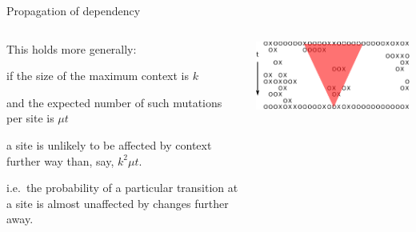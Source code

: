 \documentclass[smaller]{beamer}
\begin{document}
\begin{frame}{Propagation of dependency}

  \begin{columns}[c]
    \begin{column}{.5\textwidth}

      This holds more generally:

      \vspace{1em}

      if the size of the maximum context is $k$

      \vspace{1em}

      and the expected number of such mutations per site is $\mu t$

      \vspace{1em}

      a site is unlikely to be affected by context further way than, say, $k^2 \mu t$.

      \vspace{1em}

      i.e.\ the probability of a particular transition at a site is almost unaffected by changes further away.

    \end{column}
    \begin{column}{.5\textwidth}

      \includegraphics[width=\textwidth]{../../../writeup-plots/talk-tasep-fig-3}

    \end{column}
  \end{columns}

\end{frame}
\end{document}
